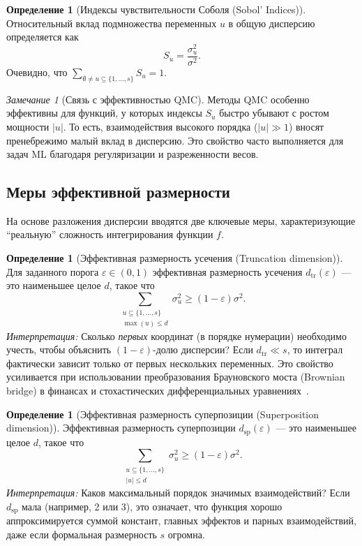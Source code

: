 \documentclass[12pt, a4paper]{article}
\theoremstyle{plain}
\theoremstyle{definition}
\newtheorem{definition}[theorem]{Определение}
\theoremstyle{remark}
\newtheorem{remark}[theorem]{Замечание}
\newcommand{\Is}{\{1, \dots, s\}}
\begin{document}
\begin{definition}[Индексы чувствительности Соболя (Sobol' Indices)]
    Относительный вклад подмножества переменных $u$ в общую дисперсию определяется как
    \begin{equation}
        S_u = \frac{\sigma_u^2}{\sigma^2}.
    \end{equation}
    Очевидно, что $\sum_{\emptyset \neq u \subseteq \Is} S_u = 1$.
\end{definition}

\begin{remark}[Связь с эффективностью QMC]
    Методы QMC особенно эффективны для функций, у которых индексы $S_u$ быстро убывают с ростом мощности $|u|$. То есть, взаимодействия высокого порядка ($|u| \gg 1$) вносят пренебрежимо малый вклад в дисперсию. Это свойство часто выполняется для задач ML благодаря регуляризации и разреженности весов.
\end{remark}

\subsection{Меры эффективной размерности}
На основе разложения дисперсии вводятся две ключевые меры, характеризующие ``реальную'' сложность интегрирования функции $f$.

\begin{definition}[Эффективная размерность усечения (Truncation dimension)]
    Для заданного порога $\varepsilon \in (0,1)$ эффективная размерность усечения $d_{\text{tr}}(\varepsilon)$ --- это наименьшее целое $d$, такое что
    \begin{equation}
        \sum_{\substack{u \subseteq \Is \\ \max(u) \le d}} \sigma_u^2 \ge (1 - \varepsilon) \sigma^2.
    \end{equation}
    \textit{Интерпретация:} Сколько \textit{первых} координат (в порядке нумерации) необходимо учесть, чтобы объяснить $(1-\varepsilon)$-долю дисперсии? Если $d_{\text{tr}} \ll s$, то интеграл фактически зависит только от первых нескольких переменных. Это свойство усиливается при использовании преобразования Брауновского моста (Brownian bridge) в финансах и стохастических дифференциальных уравнениях~\cite{caflisch1997valuation}.
\end{definition}

\begin{definition}[Эффективная размерность суперпозиции (Superposition dimension)]
    Эффективная размерность суперпозиции $d_{\text{sp}}(\varepsilon)$ --- это наименьшее целое $d$, такое что
    \begin{equation}
        \sum_{\substack{u \subseteq \Is \\ |u| \le d}} \sigma_u^2 \ge (1 - \varepsilon) \sigma^2.
    \end{equation}
    \textit{Интерпретация:} Каков максимальный порядок значимых взаимодействий? Если $d_{\text{sp}}$ мала (например, 2 или 3), это означает, что функция хорошо аппроксимируется суммой констант, главных эффектов и парных взаимодействий, даже если формальная размерность $s$ огромна.
\end{definition}
\end{document}
